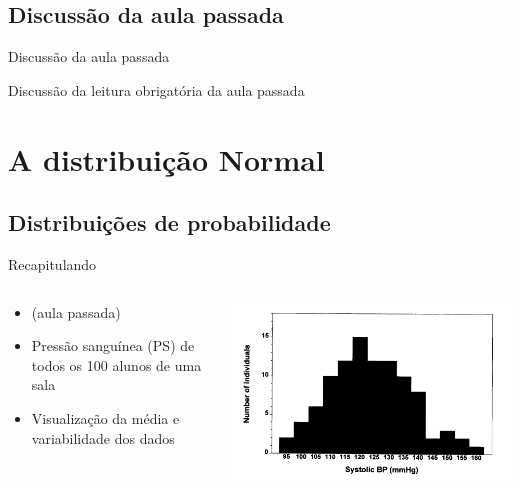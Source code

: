 \documentclass{beamer}
\begin{document}
\subsection{Discussão da aula passada}

\begin{frame}{Discussão da aula passada}
  \begin{block}{}
    Discussão da leitura obrigatória da aula passada
  \end{block}
\end{frame}

\section{A distribuição Normal}

\subsection{Distribuições de probabilidade}

\begin{frame}{Recapitulando}
  \begin{columns}
    \begin{column}{5cm}
      \begin{itemize}
      \item (aula passada)
      \item Pressão sanguínea (PS) de todos os 100 alunos de uma sala
      \item Visualização da média e variabilidade dos dados
      \end{itemize}
    \end{column}
    \begin{column}{5cm}
      \includegraphics[width=\textwidth]{Cap3/histograma1}
    \end{column}
  \end{columns}
\end{frame}
\end{document}
